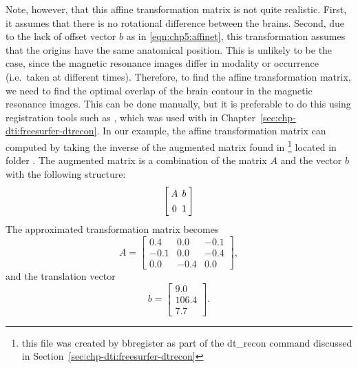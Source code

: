 Note, however, that this affine transformation matrix is not quite
realistic. First, it assumes that there is no rotational difference
between the brains. Second, due to the lack of offset vector $b$ as in 
\eqref{eqn:chp5:affinet}, this transformation assumes that the origins have 
the same anatomical position. This is unlikely to be the case, since the 
magnetic resonance images differ in modality or occurrence (i.e.~taken at 
different times).  %
Therefore, to find the affine transformation matrix, we need to find the 
optimal overlap of the brain contour in the magnetic resonance images. This can 
be done manually, but it is preferable to do this using registration tools 
such as , which was used with
 in Chapter~\ref{sec:chp-dti:freesurfer-dtrecon}. In
our example, the affine transformation matrix can computed by taking
the inverse of the augmented matrix found in \footnote{this 
file was created by bbregister as part of the dt\_recon command discussed 
in Section~\ref{sec:chp-dti:freesurfer-dtrecon}} located in folder 
. The augmented matrix is a combination of the 
matrix $A$ and the vector $b$ with the following structure:
\[\arraycolsep=2.0pt\def\arraystretch{1.3}
\left[
\begin{array}{cc}
  A  & b \\
  0 & 1\\
\end{array}\right]
\] 
The approximated
transformation matrix becomes
\[
A = \left[
\begin{array}{ccc}
  0.4 & 0.0 &-0.1 \\
 -0.1 & 0.0 &-0.4 \\
  0.0 &-0.4 & 0.0 
\end{array}\right],
\]
and the translation vector 
\[
b = \left[
\begin{array}{c}
  9.0 \\
106.4 \\
  7.7
\end{array}\right].
\]










